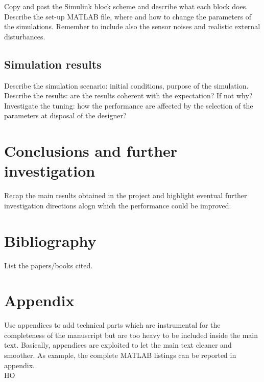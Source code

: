 \documentclass[]{report}
\begin{document}
Copy and past the Simulink block scheme and describe what each block does. Describe the set-up MATLAB file, where and how to change the parameters of the simulations. Remember to include also the sensor noises and realistic external disturbances.

\section{Simulation results}
Describe the simulation scenario: initial conditions, purpose of the simulation. Describe the results: are the results coherent with the expectation? If not why? Investigate the tuning: how the performance are affected by the selection of the parameters at disposal of the designer?

\chapter{Conclusions and further investigation}
Recap the main results obtained in the project and highlight eventual further investigation directions alogn which the performance could be improved. 

\newpage
\chapter*{Bibliography}
List the papers/books cited.

\newpage
\appendix
\chapter*{Appendix}
Use appendices to add technical parts which are instrumental for the completeness of the manuscript but are too heavy to be included inside the main text. Basically, appendices are exploited to let the main text cleaner and smoother. As example, the complete MATLAB listings can be reported in appendix.\\

HO
\end{document}
